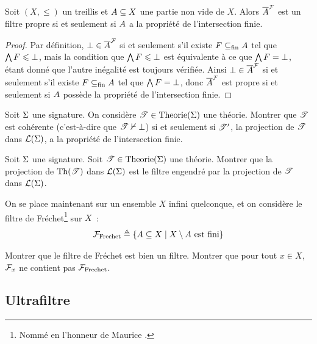 \begin{proposition}
  Soit $(X,\leq)$ un treillis et $A\subseteq X$ une partie non vide de $X$.
  Alors $\overline{A}^{\mathcal{F}}$ est un filtre propre si et seulement si $A$ a la
  propriété de l'intersection finie.
\end{proposition}

\begin{proof}
  Par définition, $\bot\in \overline{A}^{\mathcal{F}}$ si et seulement s'il existe
  $F\subseteq_{\mathrm{fin}} A$ tel que $\bigwedge F \leqslant \bot$, mais la condition que
  $\bigwedge F\leqslant \bot$ est équivalente à ce que $\bigwedge F = \bot$, étant donné que
  l'autre inégalité est toujours vérifiée. Ainsi $\bot\in\overline{A}^{\mathcal{F}}$ si
  et seulement s'il existe $F\subseteq_{\mathrm{fin}} A$ tel que $\bigwedge F = \bot$, donc
  $\overline{A}^{\mathcal{F}}$ est propre si et seulement si $A$ possède la
  propriété de l'intersection finie.
\end{proof}

\begin{exercise}
  Soit $\Sigma$ une signature. On considère $\mathscr T\in\operatorname{Theorie}(\Sigma)$
  une théorie. Montrer que $\mathscr T$ est cohérente (c'est-à-dire que
  $\mathscr T\nvdash \bot$) si et seulement si $\mathscr T'$, la projection
  de $\mathscr T$ dans $\mathcal{L}(\Sigma)$, a la propriété de l'intersection
  finie.
\end{exercise}

\begin{exercise}
  Soit $\Sigma$ une signature. Soit $\mathscr T\in\operatorname{Theorie}(\Sigma)$ une
  théorie. Montrer que la projection de $\operatorname{Th}(\mathscr T)$ dans
  $\mathcal{L}(\Sigma)$ est le filtre engendré par la projection de $\mathscr T$
  dans $\mathcal{L}(\Sigma)$.
\end{exercise}

\begin{exercise}
  On se place maintenant sur un ensemble $X$ infini quelconque, et on considère
  le filtre de Fréchet\footnote{Nommé en l'honneur de Maurice .}
  sur $X$~:
  \[\mathcal{F}_{\mathrm{Frechet}} \triangleq \left\{ A\subseteq X \;\middle\vert\; X \setminus A\text{ est fini} \right\}\]

  Montrer que le filtre de Fréchet est bien un filtre. Montrer que pour
  tout $x \in X$, $\mathcal{F}_{x}$ ne contient pas $\mathcal{F}_{\mathrm{Frechet}}$.
\end{exercise}

\subsection{Ultrafiltre}\label{sbsct.ultrafiltre}

